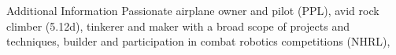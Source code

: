 \begin{rubric}{Additional Information}
\entry*[Interests]%
Passionate airplane owner and pilot (PPL), 
avid rock climber (5.12d), 
tinkerer and maker with a broad scope of projects and techniques, 
builder and participation in combat robotics competitions (NHRL), 
\end{rubric}
